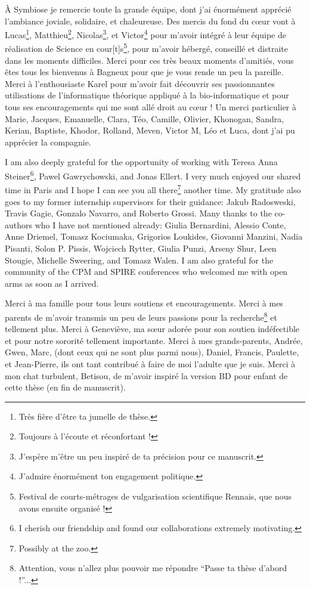 À Symbiose je remercie toute la grande équipe, dont j'ai énormément apprécié l’ambiance joviale, solidaire, et chaleureuse.
Des mercis du fond du cœur vont à Lucas\footnote{Très fière d’être ta jumelle de thèse.}, Matthieu\footnote{Toujours à l'écoute et réconfortant !},  Nicolas\footnote{J’espère m’être un peu inspiré de ta précision pour ce manuscrit.}, et Victor\footnote{J’admire énormément ton engagement politique.}  pour m’avoir intégré à leur équipe de réalisation de Science en cour[t]s\footnote{Festival de courts-métrages de vulgarisation scientifique Rennais, que nous avons ensuite organisé !}, pour m’avoir hébergé, conseillé et distraite dans les moments difficiles. Merci pour ces très beaux moments d’amitiés, vous êtes tous les bienvenus à Bagneux pour que je vous rende un peu la pareille.
Merci à l’enthousiaste Karel pour m’avoir fait découvrir ses passionnantes utilisations de l’informatique théorique appliqué à la bio-informatique et pour tous ses encouragements qui me sont allé droit au cœur !
Un merci particulier à Marie, Jacques, Emanuelle, Clara, Téo, Camille, Olivier, Khonogan, Sandra, Kerian, Baptiste, Khodor, Rolland, Meven, Victor M, Léo et Luca, dont j’ai pu apprécier la compagnie.


I am also deeply grateful for the opportunity of working with Teresa Anna Steiner\footnote{I cherish our friendship and found our collaborations extremely motivating.}, Pawel Gawrychowski, and Jonas Ellert. I very much enjoyed our shared time in Paris and I hope I can see you all there\footnote{Possibly at the zoo.} another time.
My gratitude also goes to my former internship supervisors for their guidance: Jakub Radosweski, Travis Gagie, Gonzalo Navarro, and Roberto Grossi.
Many thanks to the co-authors who I have not mentioned already: Giulia Bernardini, Alessio Conte, Anne Driemel, Tomasz Kociumaka, Grigorios Loukides, Giovanni Manzini, Nadia Pisanti, Solon P. Pissis, Wojciech Rytter, Giulia Punzi, Arseny Shur, Leen Stougie, Michelle Sweering, and Tomasz Walen.
I am also grateful for the community of the CPM and SPIRE conferences who welcomed me with open arms as soon as I arrived.


Merci à ma famille pour tous leurs soutiens et encouragements. Merci à mes parents de m’avoir transmis un peu de leurs passions pour la recherche\footnote{Attention, vous n’allez plus pouvoir me répondre ``Passe ta thèse d’abord !''...} et tellement plus. Merci à Geneviève, ma sœur adorée pour son soutien indéfectible et pour notre sororité tellement importante. Merci à mes grands-parents, Andrée, Gwen, Marc, (dont ceux qui ne sont plus parmi nous), Daniel, Francis, Paulette, et Jean-Pierre, ils ont tant contribué à faire de moi l’adulte que je suis. Merci à mon chat turbulent, Betisou, de m’avoir inspiré la version BD pour enfant de cette thèse (en fin de manuscrit).

